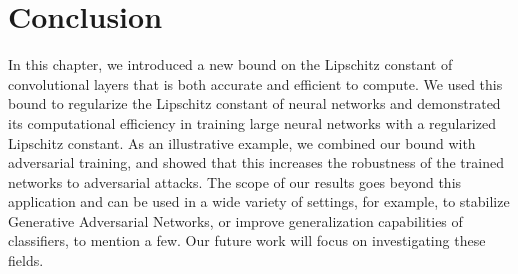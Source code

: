 \section{Conclusion}
\label{section:ch5-conclusion}

In this chapter, we introduced a new bound on the Lipschitz constant of convolutional layers that is both accurate and efficient to compute.
We used this bound to regularize the Lipschitz constant of neural networks and demonstrated its computational efficiency in training large neural networks with a regularized Lipschitz constant.
As an illustrative example, we   combined our bound with adversarial training, and showed that this increases the robustness of the trained networks to  adversarial attacks.
The scope of our results goes beyond this application and can be used  in a wide variety of settings, for example, to stabilize Generative Adversarial Networks, or improve generalization capabilities of classifiers, to mention a few.
Our future work will focus on investigating these fields. 






